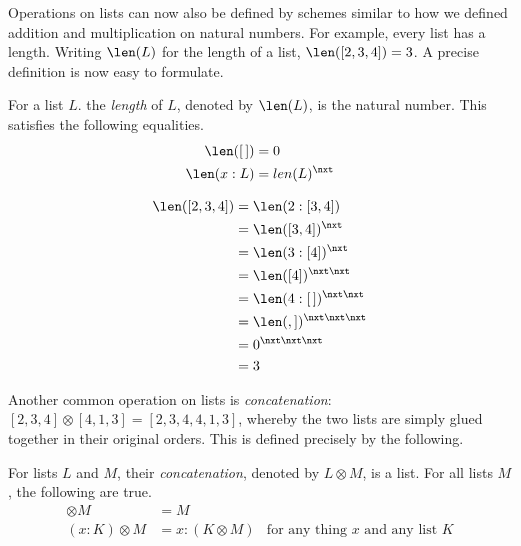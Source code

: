Operations on lists can now also be defined by schemes similar to how 
we defined addition and multiplication on natural numbers. For example,
every list has a length. Writing $\len(L)$ for the length of a list,
$\len([2,3,4]) = 3$.  A precise definition is now easy to formulate.

\begin{definition}
  For a list $L$. the \emph{length} of $L$, denoted by $\len(L)$, is
  the natural number. This satisfies the following equalities.
  \begin{align*}
    \len([\,]) &= 0\\
    \len(x:L) &= len(L)^\nxt
  \end{align*}
\end{definition}

\begin{example}
  \begin{align*}
    \len([2,3,4]) &= \len(2:[3,4])\\
    &= \len([3,4])^\nxt\\
    &= \len(3:[4])^\nxt\\
    &= \len([4])^{\nxt\nxt}\\
    &= \len(4:[\,])^{\nxt\nxt}\\
    &= \len(,])^{\nxt\nxt\nxt}\\
    &= 0^{\nxt\nxt\nxt}\\
    &= 3
  \end{align*}
\end{example}

\ipadbreak

Another common operation on lists is \emph{concatenation}:
$[2,3,4]\otimes[4,1,3] = [2,3,4,4,1,3]$, whereby the two lists are simply glued together in their original orders.  This is defined precisely by
the following.

\begin{defn}
  For lists $L$ and $M$, their \emph{concatenation}, denoted by
  $L\otimes M$, is a list. For all lists $M$, the following are true.
  \begin{align*}
    [\,]\otimes M &= M\\
    (x:K)\otimes M &= x:(K\otimes M) & \text{for any thing $x$ and any list $K$}
  \end{align*}
\end{defn}

